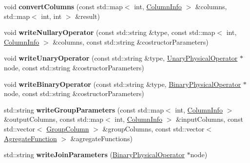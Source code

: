\begin{DoxyCompactItemize}
\item 
\hypertarget{class_bobox_plan_writing_physical_operator_visitor_a809cf16afde7b5714466438602925355}{void {\bfseries convert\+Columns} (const std\+::map$<$ int, \hyperlink{class_column_info}{Column\+Info} $>$ \&columns, std\+::map$<$ int, int $>$ \&result)}\label{class_bobox_plan_writing_physical_operator_visitor_a809cf16afde7b5714466438602925355}

\item 
\hypertarget{class_bobox_plan_writing_physical_operator_visitor_a3d0b2c26562a904deac5d003eee02faf}{void {\bfseries write\+Nullary\+Operator} (const std\+::string \&type, const std\+::map$<$ int, \hyperlink{class_column_info}{Column\+Info} $>$ \&columns, const std\+::string \&costructor\+Parameters)}\label{class_bobox_plan_writing_physical_operator_visitor_a3d0b2c26562a904deac5d003eee02faf}

\item 
\hypertarget{class_bobox_plan_writing_physical_operator_visitor_aacdb98a45fe5a45d5f86898e4b6d4ff1}{void {\bfseries write\+Unary\+Operator} (const std\+::string \&type, \hyperlink{class_unary_physical_operator}{Unary\+Physical\+Operator} $\ast$node, const std\+::string \&costructor\+Parameters)}\label{class_bobox_plan_writing_physical_operator_visitor_aacdb98a45fe5a45d5f86898e4b6d4ff1}

\item 
\hypertarget{class_bobox_plan_writing_physical_operator_visitor_a2a3636390a5c12828b2814ac96a46410}{void {\bfseries write\+Binary\+Operator} (const std\+::string \&type, \hyperlink{class_binary_physical_operator}{Binary\+Physical\+Operator} $\ast$node, const std\+::string \&costructor\+Parameters)}\label{class_bobox_plan_writing_physical_operator_visitor_a2a3636390a5c12828b2814ac96a46410}

\item 
\hypertarget{class_bobox_plan_writing_physical_operator_visitor_a96eb34b06365296896e890123abdfa01}{std\+::string {\bfseries write\+Group\+Parameters} (const std\+::map$<$ int, \hyperlink{class_column_info}{Column\+Info} $>$ \&output\+Columns, const std\+::map$<$ int, \hyperlink{class_column_info}{Column\+Info} $>$ \&input\+Columns, const std\+::vector$<$ \hyperlink{class_group_column}{Group\+Column} $>$ \&group\+Columns, const std\+::vector$<$ \hyperlink{class_agregate_function}{Agregate\+Function} $>$ \&agregate\+Functions)}\label{class_bobox_plan_writing_physical_operator_visitor_a96eb34b06365296896e890123abdfa01}

\item 
\hypertarget{class_bobox_plan_writing_physical_operator_visitor_a1a836021544f1e6cd117620b888819ba}{std\+::string {\bfseries write\+Join\+Parameters} (\hyperlink{class_binary_physical_operator}{Binary\+Physical\+Operator} $\ast$node)}\label{class_bobox_plan_writing_physical_operator_visitor_a1a836021544f1e6cd117620b888819ba}


\end{DoxyCompactItemize}
